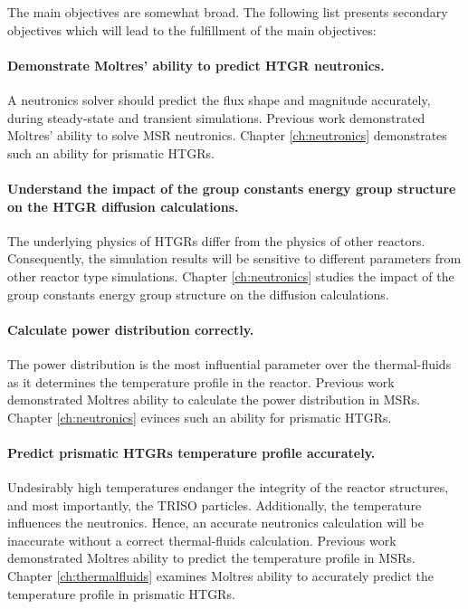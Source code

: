 \vskip 0.6cm
The main objectives are somewhat broad.
The following list presents secondary objectives which will lead to the fulfillment of the main objectives:

\paragraph{Demonstrate Moltres' ability to predict HTGR neutronics.}
A neutronics solver should predict the flux shape and magnitude accurately, during steady-state and transient simulations.
Previous work demonstrated Moltres' ability to solve MSR neutronics.
Chapter \ref{ch:neutronics} demonstrates such an ability for prismatic HTGRs.

\paragraph{Understand the impact of the group constants energy group structure on the HTGR diffusion calculations.}
The underlying physics of \glspl{HTGR} differ from the physics of other reactors.
Consequently, the simulation results will be sensitive to different parameters from other reactor type simulations.
Chapter \ref{ch:neutronics} studies the impact of the group constants energy group structure on the diffusion calculations.

\paragraph{Calculate power distribution correctly.}
The power distribution is the most influential parameter over the thermal-fluids as it determines the temperature profile in the reactor.
Previous work demonstrated Moltres ability to calculate the power distribution in MSRs.
Chapter \ref{ch:neutronics} evinces such an ability for prismatic HTGRs.

\paragraph{Predict prismatic HTGRs temperature profile accurately.}
Undesirably high temperatures endanger the integrity of the reactor structures, and most importantly, the TRISO particles.
Additionally, the temperature influences the neutronics.
Hence, an accurate neutronics calculation will be inaccurate without a correct thermal-fluids calculation. 
Previous work demonstrated Moltres ability to predict the temperature profile in MSRs.
Chapter \ref{ch:thermalfluids} examines Moltres ability to accurately predict the temperature profile in prismatic HTGRs.

